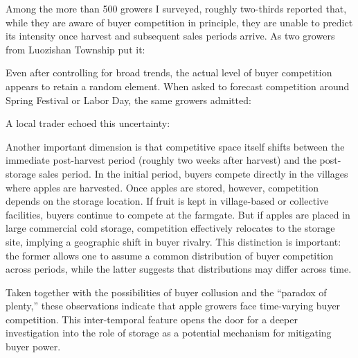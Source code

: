 Among the more than 500 growers I surveyed, roughly two-thirds reported that, while they are aware of buyer competition in principle, they are unable to predict its intensity once harvest and subsequent sales periods arrive. As two growers from Luozishan Township put it: 
\begin{quote}  \end{quote}


Even after controlling for broad trends, the actual level of buyer competition appears to retain a random element. When asked to forecast competition around Spring Festival or Labor Day, the same growers admitted: 
\begin{quote}  \end{quote} A local trader echoed this uncertainty: 
\begin{quote}  \end{quote}

Another important dimension is that competitive space itself shifts between the immediate post-harvest period (roughly two weeks after harvest) and the post-storage sales period. In the initial period, buyers compete directly in the villages where apples are harvested. Once apples are stored, however, competition depends on the storage location. If fruit is kept in village-based or collective facilities, buyers continue to compete at the farmgate. But if apples are placed in large commercial cold storage, competition effectively relocates to the storage site, implying a geographic shift in buyer rivalry. This distinction is important: the former allows one to assume a common distribution of buyer competition across periods, while the latter suggests that distributions may differ across time.  

Taken together with the possibilities of buyer collusion and the ``paradox of plenty,'' these observations indicate that apple growers face time-varying buyer competition. This inter-temporal feature opens the door for a deeper investigation into the role of storage as a potential mechanism for mitigating buyer power.







